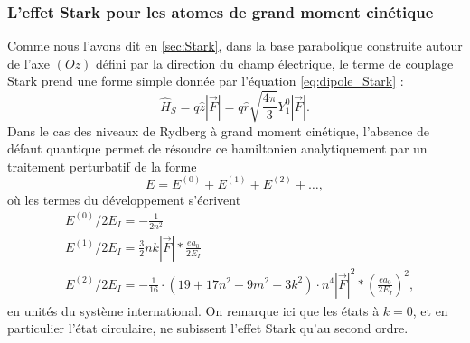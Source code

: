 \subsubsection*{L'effet Stark pour les atomes de grand moment cinétique}
\noindent Comme nous l'avons dit en \ref{sec:Stark}, dans la base parabolique construite autour de l'axe $(Oz)$ défini par la direction du champ électrique, le terme de couplage Stark prend une forme simple donnée par l'équation \eqref{eq:dipole_Stark} :
\begin{equation}
\label{eq:dipole_Stark2}
\hat{H}_S = q\hat{z}|\vec{F}| = q\hat{r} \sqrt{\frac{4\pi}{3}} Y_1^0  |\vec{F}|.
\end{equation}
%
Dans le cas des niveaux de Rydberg à grand moment cinétique, l'absence de défaut quantique permet de résoudre ce hamiltonien analytiquement par un traitement perturbatif de la forme \cite{TXT_BETHE_ONELECTRONATOMS} 
\begin{equation}
\label{eq:perturbative_energy}
E = E^{(0)}+E^{(1)}+E^{(2)}+\dots,
\end{equation}
où les termes du développement s'écrivent
\begin{equation}
\label{eq:Stark_circular}
\begin{aligned}
&E^{(0)}/2E_I = -\frac{1}{2n^2} \\
&E^{(1)}/2E_I = \frac{3}{2}nk|\vec{F}|*\frac{ea_0}{2E_I} \\
&E^{(2)}/2E_I = -\frac{1}{16}\cdot (19+17n^2-9m^2-3k^2) \cdot n^4|\vec{F}|^2*\left( \frac{ea_0}{2E_I}\right) ^2,
\end{aligned}
\end{equation}
%
en unités du système international.
On remarque ici que les états à $k=0$, et en particulier l'état circulaire, ne subissent l'effet Stark qu'au second ordre.

